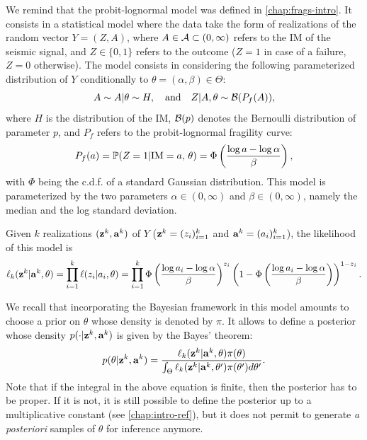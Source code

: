 We remind that the probit-lognormal model was defined in   \cref{chap:frags-intro}. It consists in a statistical model where the data take the form of realizations of the random vector $Y=(Z,A)$, where $A\in\mathcal{A}\subset(0,\infty)$ refers to the IM of the seismic signal, and $Z\in\{0,1\}$ refers to the outcome ($Z=1$ in case of a failure, $Z=0$ otherwise). The model consists in considering
the following parameterized distribution of $Y$ conditionally to $\theta=(\alpha,\beta)\in\Theta$:
    \begin{equation}
        A\sim A|\theta\sim H,\quad\text{and}\quad Z|A,\theta\sim\mathcal{B}(P_f(A)),
    \end{equation}
where $H$ is the distribution of the IM, $\mathcal{B}(p)$ denotes the Bernoulli distribution of parameter $p$, and $P_f$ refers to the probit-lognormal fragility curve:
\begin{equation}
    P_f(a) = \mathbb{P}(Z=1|\text{IM}=a,\,\theta) = \Phi\left(\frac{\log a-\log\alpha}{\beta}\right),
\end{equation}
with $\Phi$ being the c.d.f. of a standard Gaussian distribution. This model is parameterized by the two parameters $\alpha\in(0,\infty)$ and $\beta\in(0,\infty)$, namely the median and the log standard deviation. 

Given $k$ realizations $(\mathbf{z}^k,\mathbf{a}^k)$ of $Y$ ($\mathbf{z}^k=(z_i)_{i=1}^k$ and $\mathbf{a}^k=(a_i)_{i=1}^k$), the likelihood of this model is
\begin{equation}\label{eq:constr-frag:likelihood}
    \ell_k(\mathbf{z}^k|\mathbf{a}^k,\theta) = \prod_{i=1}^k\ell(z_i|a_i,\theta) = \prod_{i=1}^k\Phi\left(\frac{\log a_i-\log\alpha}{\beta}\right)^{z_i}\left(1-\Phi\left(\frac{\log a_i-\log\alpha}{\beta}\right)\right)^{1-z_i}.
\end{equation}






We recall that incorporating the Bayesian framework in this model amounts to choose a prior on $\theta$ whose density is denoted by $\pi$.
It allows to define a posterior whose density $p(\cdot|\mathbf{z}^k,\mathbf{a}^k)$ is given by the Bayes' theorem:
\begin{equation}\label{eq:constr-frag:posterior}
    p(\theta|\mathbf{z}^k,\mathbf{a}^k) = \frac{\ell_k(\mathbf{z}^k|\mathbf{a}^k,\theta)\pi(\theta)}{\int_{\Theta}\ell_k(\mathbf{z}^k|\mathbf{a}^k,\theta')\pi(\theta')d\theta'}.
\end{equation}
Note that if the integral in the above equation is finite, then the posterior has to be proper. If it is not, it is still possible to define the posterior up to a multiplicative constant (see   \cref{chap:intro-ref}), but it does not permit to generate \emph{a posteriori} samples of $\theta$ for inference anymore.




